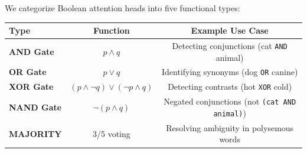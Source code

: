 We categorize Boolean attention heads into five functional types:













\begin{table}[h]






\centering






\begin{tabular}{|l|c|c|}






\hline






\textbf{Type} & \textbf{Function} & \textbf{Example Use Case} \\






\hline






\textbf{AND Gate} & $p \land q$ & Detecting conjunctions (cat \texttt{AND} animal) \\






\textbf{OR Gate} & $p \lor q$ & Identifying synonyms (dog \texttt{OR} canine) \\






\textbf{XOR Gate} & $(p \land \neg q) \lor (\neg p \land q)$ & Detecting contrasts (hot \texttt{XOR} cold) \\






\textbf{NAND Gate} & $\neg(p \land q)$ & Negated conjunctions (not \texttt{(cat AND animal)}) \\






\textbf{MAJORITY} & 3/5 voting & Resolving ambiguity in polysemous words \\






\hline






\end{tabular}






\end{table}













